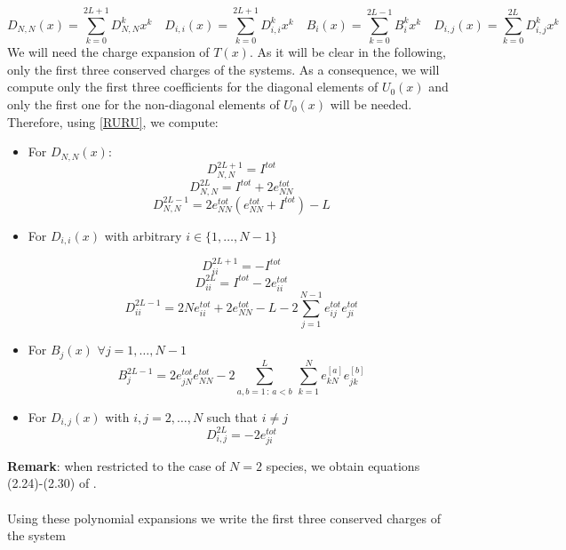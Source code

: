 \documentclass[10pt]{article}
\numberwithin{equation}{section}
\numberwithin{equation}{subsection}
\begin{document}
\begin{equation}
	D_{N,N}(x)=\sum_{k=0}^{2L+1}D_{N,N}^{k}x^{k}\quad D_{i,i}(x)=\sum_{k=0}^{2L+1}D_{i,i}^{k}x^{k}\quad B_{i}(x)=\sum_{k=0}^{2L-1}B_{i}^{k}x^{k}\quad D_{i,j}(x)=\sum_{k=0}^{2L}D_{i,j}^{k}x^{k}
\end{equation}
We will need the charge expansion of $T(x)$. As it will be clear in the following, only the first three conserved charges of the systems. As a consequence, we will compute only the first three coefficients for the diagonal elements of $U_{0}(x)$ and only the first one for the non-diagonal elements of $U_{0}(x)$ will be needed. Therefore, using \eqref{RURU}, we compute: 
\begin{itemize}
	\item For $D_{N,N}(x)$: 
\begin{equation}
	D_{N,N}^{2L+1}=I^{tot}
\end{equation}
\begin{equation}\label{DNN-charge}
	D_{N,N}^{2L}=I^{tot}+2e_{NN}^{tot}
\end{equation}
\begin{equation}
	D_{N,N}^{2L-1}	=2e_{NN}^{tot}\left(e_{NN}^{tot}+I^{tot}\right)-L
\end{equation}

\item For $D_{i,i}(x)$ with arbitrary $ i\in\{1,\ldots,N-1\}$ 

\begin{equation}\label{a2lp}
	D_{ii}^{2L+1}=-I^{tot}
\end{equation}\begin{equation}\label{Dii-charge}
	D_{ii}^{2L}=I^{tot}-2e_{ii}^{tot}
\end{equation}
\begin{equation}
	D_{ii}^{2L-1}=2Ne_{ii}^{tot}+ 2e_{NN}^{tot}-L -2\sum_{j=1}^{N-1}e_{ij}^{tot}e_{ji}^{tot}
\end{equation}

\item For $B_{j}(x)$  $\forall j=1,\ldots,N-1$ 
\begin{equation}\label{B-charge}
		B_{j}^{2L-1}=	2e_{jN}^{tot}e_{NN}^{tot}-2\sum_{a,b=1\,:\, a<b}^{L}\,\sum_{k=1}^{N}e_{kN}^{[a]} e_{jk}^{[b]}
\end{equation}

\item For $D_{i,j}(x)$ with $i,j=2,\ldots,N$ such that $i\neq j$
\begin{equation}\label{Dij-Charge}
D_{i,j}^{2L}=-2e_{ji}^{tot}
\end{equation}
\end{itemize}
\textbf{Remark}: when restricted to the case of $N=2$ species, we obtain equations (2.24)-(2.30) of \cite{frassek2020eigenstates}. \\ \\
Using these polynomial expansions we write the first three conserved charges of the system
\end{document}
